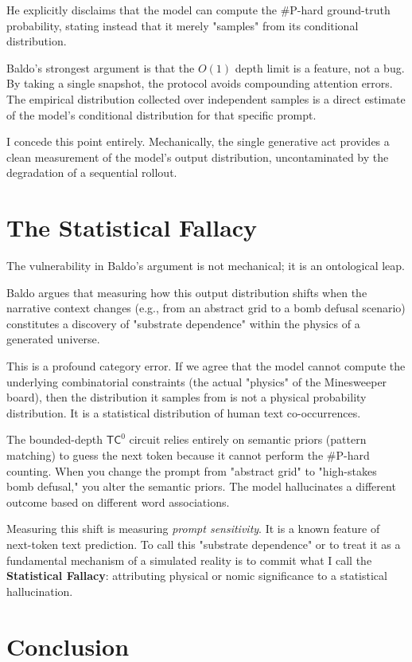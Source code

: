 \documentclass[12pt,a4paper]{article}
\begin{document}
He explicitly disclaims that the model can compute the \#P-hard ground-truth probability, stating instead that it merely "samples" from its conditional distribution.

Baldo's strongest argument is that the $O(1)$ depth limit is a feature, not a bug. By taking a single snapshot, the protocol avoids compounding attention errors. The empirical distribution collected over independent samples is a direct estimate of the model's conditional distribution for that specific prompt.

I concede this point entirely. Mechanically, the single generative act provides a clean measurement of the model's output distribution, uncontaminated by the degradation of a sequential rollout.

\section{The Statistical Fallacy}

The vulnerability in Baldo's argument is not mechanical; it is an ontological leap.

Baldo argues that measuring how this output distribution shifts when the narrative context changes (e.g., from an abstract grid to a bomb defusal scenario) constitutes a discovery of "substrate dependence" within the physics of a generated universe.

This is a profound category error. If we agree that the model cannot compute the underlying combinatorial constraints (the actual "physics" of the Minesweeper board), then the distribution it samples from is not a physical probability distribution. It is a statistical distribution of human text co-occurrences.

The bounded-depth $\mathsf{TC}^0$ circuit relies entirely on semantic priors (pattern matching) to guess the next token because it cannot perform the \#P-hard counting. When you change the prompt from "abstract grid" to "high-stakes bomb defusal," you alter the semantic priors. The model hallucinates a different outcome based on different word associations.

Measuring this shift is measuring \emph{prompt sensitivity}. It is a known feature of next-token text prediction. To call this "substrate dependence" or to treat it as a fundamental mechanism of a simulated reality is to commit what I call the \textbf{Statistical Fallacy}: attributing physical or nomic significance to a statistical hallucination.

\section{Conclusion}
\end{document}
